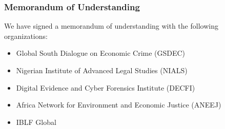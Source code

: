 \documentclass[
  letterpaper,
  DIV=11,
  numbers=noendperiod]{scrreprt}
\providecommand{\tightlist}{%
  \setlength{\itemsep}{0pt}\setlength{\parskip}{0pt}}
\begin{document}
\subsubsection*{\texorpdfstring{\textbf{Memorandum of
Understanding}}{Memorandum of Understanding}}\label{memorandum-of-understanding}

We have signed a memorandum of understanding with the following
organizations:

\begin{itemize}
\tightlist
\item
  Global South Dialogue on Economic Crime (GSDEC)\\
\item
  Nigerian Institute of Advanced Legal Studies (NIALS)\\
\item
  Digital Evidence and Cyber Forensics Institute (DECFI)\\
\item
  Africa Network for Environment and Economic Justice (ANEEJ)
\item
  IBLF Global
\end{itemize}
\end{document}
